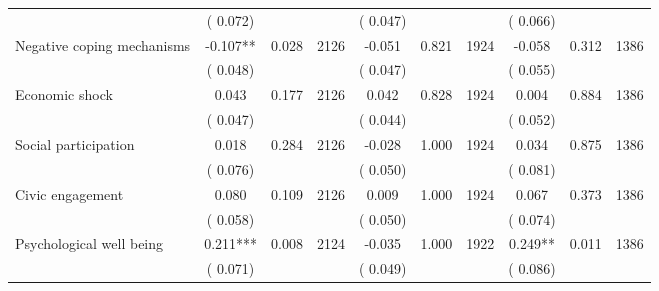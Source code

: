 \begin{tabular}{l*{9}{c}}
                               &        (       0.072) & &                                                                &       (       0.047) & &                                                         &       (       0.066) & & \\ 
 Negative coping mechanisms                &             -0.107**        &        0.028 & 2126        &             -0.051 &        0.821 & 1924               &       -0.058 &        0.312 & 1386       \\ 
                               &        (       0.048) & &                                                                &       (       0.047) & &                                                         &       (       0.055) & & \\ 
 Economic shock                &              0.043        &        0.177 & 2126        &              0.042 &        0.828 & 1924               &        0.004 &        0.884 & 1386       \\ 
                               &        (       0.047) & &                                                                &       (       0.044) & &                                                         &       (       0.052) & & \\ 
 Social participation                &              0.018        &        0.284 & 2126        &             -0.028 &        1.000 & 1924               &        0.034 &        0.875 & 1386      \\ 
                               &        (       0.076) & &                                                                &       (       0.050) & &                                                         &       (       0.081) & & \\ 
 Civic engagement                &              0.080        &        0.109 & 2126        &              0.009 &        1.000 & 1924               &        0.067 &        0.373 & 1386       \\ 
                               &        (       0.058) & &                                                                &       (       0.050) & &                                                         &       (       0.074) & & \\ 
 Psychological well being                &              0.211***        &        0.008 & 2124        &             -0.035 &        1.000 & 1922               &        0.249** &        0.011 & 1386       \\ 
                               &        (       0.071) & &                                                                &       (       0.049) & &                                                         &       (       0.086) & & \\ 

\end{tabular}
